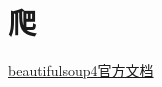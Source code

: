 
\section{爬}




\hypersetup{colorlinks=true}
\href{http://www.crummy.com/software/BeautifulSoup/bs4/doc/}{beautifulsoup4官方文档}



























